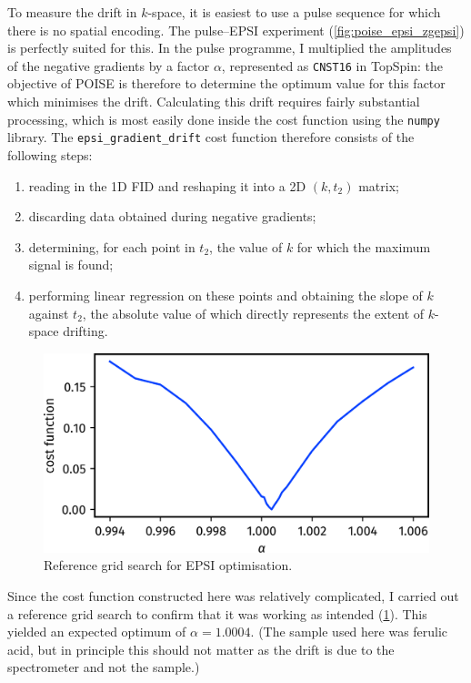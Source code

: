 To measure the drift in $k$-space, it is easiest to use a pulse sequence for which there is no spatial encoding.
The pulse--EPSI experiment (\cref{fig:poise_epsi_zgepsi}) is perfectly suited for this.
In the pulse programme, I multiplied the amplitudes of the negative gradients by a factor $\alpha$, represented as \texttt{CNST16} in TopSpin:
the objective of POISE is therefore to determine the optimum value for this factor which minimises the drift.
Calculating this drift requires fairly substantial processing, which is most easily done inside the cost function using the \texttt{numpy} library.
The \texttt{epsi\_gradient\_drift} cost function therefore consists of the following steps:
\begin{enumerate}
    \item reading in the 1D FID and reshaping it into a 2D $(k, t_2)$ matrix;
    \item discarding data obtained during negative gradients;
    \item determining, for each point in $t_2$, the value of $k$ for which the maximum signal is found;
    \item performing linear regression on these points and obtaining the slope of $k$ against $t_2$, the absolute value of which directly represents the extent of $k$-space drifting.
\end{enumerate}

\begin{figure}[htb]
    \centering
    \includegraphics[]{figures/poise/epsi_scan.png}%
    \caption[Reference grid search for EPSI optimisation]{
        Reference grid search for EPSI optimisation.
    }
    \label{fig:poise_epsi_scan}
\end{figure}

Since the cost function constructed here was relatively complicated, I carried out a reference grid search to confirm that it was working as intended (\cref{fig:poise_epsi_scan}).
This yielded an expected optimum of $\alpha = 1.0004$.
(The sample used here was ferulic acid, but in principle this should not matter as the drift is due to the spectrometer and not the sample.)

